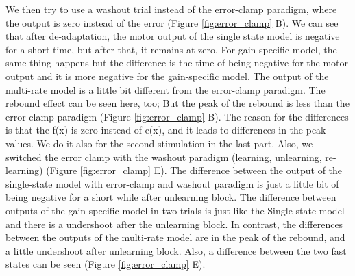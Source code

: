 \documentclass[9pt,twocolumn]{paper-template}
\begin{document}
We then try to use a washout trial instead of the error-clamp paradigm, where the output is zero instead of the error (Figure \ref{fig:error_clamp} B). We can see that after de-adaptation, the motor output of the single state model is negative for a short time, but after that, it remains at zero. For gain-specific model, the same thing happens but the difference is the time of being negative for the motor output and it is more negative for the gain-specific model. The output of the multi-rate model is a little bit different from the error-clamp paradigm. The rebound effect can be seen here, too; But the peak of the rebound is less than the error-clamp paradigm (Figure \ref{fig:error_clamp} B). The reason for the differences is that the f(x) is zero instead of e(x), and it leads to differences in the peak values. We do it also for the second stimulation in the last part. Also, we switched the error clamp with the washout paradigm (learning, unlearning, re-learning) (Figure \ref{fig:error_clamp} E). The difference between the output of the single-state model with error-clamp and washout paradigm is just a little bit of being negative for a short while after unlearning block. The difference between outputs of the gain-specific model in two trials is just like the Single state model and there is a undershoot after the unlearning block. In contrast, the differences between the outputs of the multi-rate model are in the peak of the rebound, and a little undershoot after unlearning block. Also, a difference between the two fast states can be seen (Figure \ref{fig:error_clamp} E).
\end{document}

